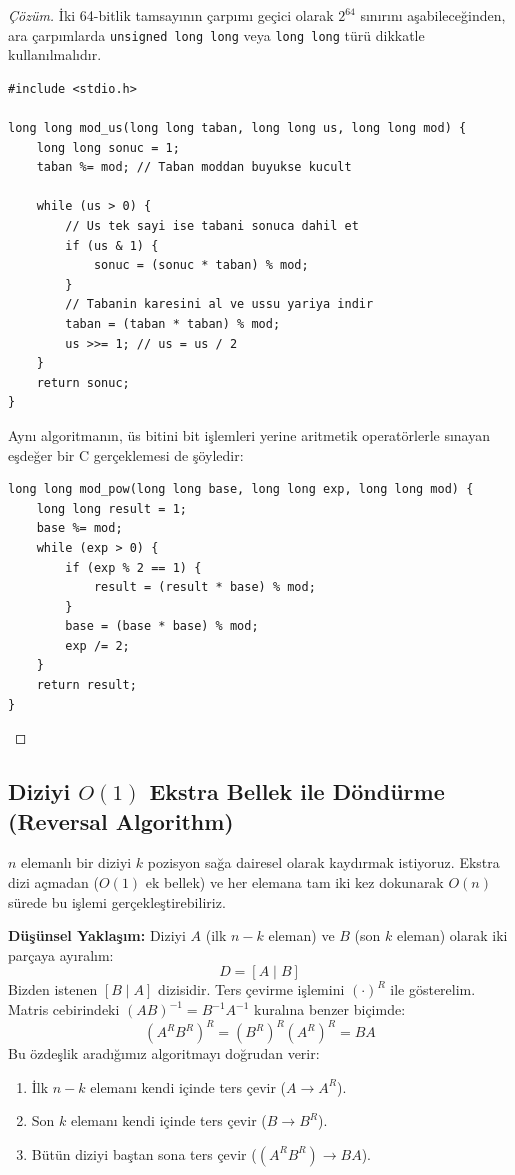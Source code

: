 \begin{proof}[Çözüm]
İki 64-bitlik tamsayının çarpımı geçici olarak $2^{64}$ sınırını aşabileceğinden, ara çarpımlarda \texttt{unsigned long long} veya \texttt{long long} türü dikkatle kullanılmalıdır.

\begin{lstlisting}[language=CTemel]
#include <stdio.h>

long long mod_us(long long taban, long long us, long long mod) {
    long long sonuc = 1;
    taban %= mod; // Taban moddan buyukse kucult
    
    while (us > 0) {
        // Us tek sayi ise tabani sonuca dahil et
        if (us & 1) {
            sonuc = (sonuc * taban) % mod;
        }
        // Tabanin karesini al ve ussu yariya indir
        taban = (taban * taban) % mod;
        us >>= 1; // us = us / 2
    }
    return sonuc;
}
\end{lstlisting}

Aynı algoritmanın, üs bitini bit işlemleri yerine aritmetik operatörlerle sınayan eşdeğer bir C gerçeklemesi de şöyledir:

\begin{lstlisting}[language=CTemel]
long long mod_pow(long long base, long long exp, long long mod) {
    long long result = 1;
    base %= mod;
    while (exp > 0) {
        if (exp % 2 == 1) {
            result = (result * base) % mod;
        }
        base = (base * base) % mod;
        exp /= 2;
    }
    return result;
}\end{lstlisting}
\end{proof}

\subsection{Diziyi $O(1)$ Ekstra Bellek ile Döndürme (Reversal Algorithm)}

$n$ elemanlı bir diziyi $k$ pozisyon sağa dairesel olarak kaydırmak istiyoruz. Ekstra dizi açmadan ($O(1)$ ek bellek) ve her elemana tam iki kez dokunarak $O(n)$ sürede bu işlemi gerçekleştirebiliriz.

\textbf{Düşünsel Yaklaşım:}
Diziyi $A$ (ilk $n-k$ eleman) ve $B$ (son $k$ eleman) olarak iki parçaya ayıralım:
\[
D = [A \mid B]
\]
Bizden istenen $[B \mid A]$ dizisidir. Ters çevirme işlemini $(\cdot)^R$ ile gösterelim. Matris cebirindeki $(AB)^{-1} = B^{-1} A^{-1}$ kuralına benzer biçimde:
\[
(A^R B^R)^R = (B^R)^R (A^R)^R = B A
\]
Bu özdeşlik aradığımız algoritmayı doğrudan verir:
\begin{enumerate}
    \item İlk $n-k$ elemanı kendi içinde ters çevir ($A \to A^R$).
    \item Son $k$ elemanı kendi içinde ters çevir ($B \to B^R$).
    \item Bütün diziyi baştan sona ters çevir ($(A^R B^R) \to B A$).
\end{enumerate}

